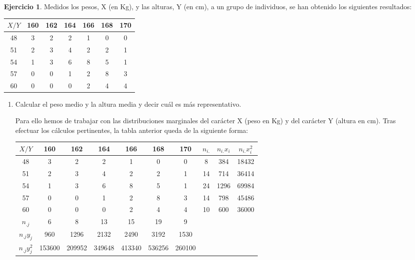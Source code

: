 \documentclass[a4paper, 12pt]{article}
\theoremstyle{definition}
\newtheorem{ej}{Ejercicio}
\begin{document}
\begin{ej}
Medidos los pesos, X (en Kg), y las alturas, Y (en cm), a un grupo de individuos, se han obtenido
los siguientes resultados:

\begin{center}
\begin{tabular}{c|cccccc}
	\(X/Y\) & 160 & 162 & 164 & 166 & 168 & 170 \\
	\hline
	48 & 3 & 2 & 2 & 1 & 0 & 0 \\
	51 & 2 & 3 & 4 & 2 & 2 & 1 \\
	54 & 1 & 3 & 6 & 8 & 5 & 1 \\
	57 & 0 & 0 & 1 & 2 & 8 & 3 \\
	60 & 0 & 0 & 0 & 2 & 4 & 4\\
\end{tabular}
\end{center}

\begin{center}
\end{center}

\begin{enumerate}[label=\alph*)]
	\item Calcular el peso medio y la altura media y decir cuál es más representativo.
	
	Para ello hemos de trabajar con las distribuciones marginales del carácter X (peso en Kg) y del carácter Y (altura en cm). Tras efectuar los cálculos pertinentes, la tabla anterior queda de la siguiente forma:
	
	\begin{center}
\begin{tabular}{c|cccccc|ccc}
	\(X/Y\) & 160 & 162 & 164 & 166 & 168 & 170 & \(n_{i.}\) & \(n_{i.}x_i\) & \(n_{i.}x_i^2\) \\
	\hline
	48 & 3 & 2 & 2 & 1 & 0 & 0 & 8 & 384 & 18432 \\
	51 & 2 & 3 & 4 & 2 & 2 & 1 & 14 & 714 & 36414\\
	54 & 1 & 3 & 6 & 8 & 5 & 1 & 24 & 1296 & 69984\\
	57 & 0 & 0 & 1 & 2 & 8 & 3 & 14 & 798 & 45486\\
	60 & 0 & 0 & 0 & 2 & 4 & 4 & 10 & 600 & 36000\\
	\hline
	\(n_{.j}\) & 6 & 8 & 13 & 15 & 19 & 9\\
	\(n_{.j} y_j\) & 960 & 1296 & 2132 & 2490 & 3192 & 1530\\
	\(n_{.j} y_j^2\) & 153600 & 209952 & 349648 & 413340 & 536256 & 260100\\
\end{tabular}
\end{center}


\end{enumerate}
\end{ej}
\end{document}
